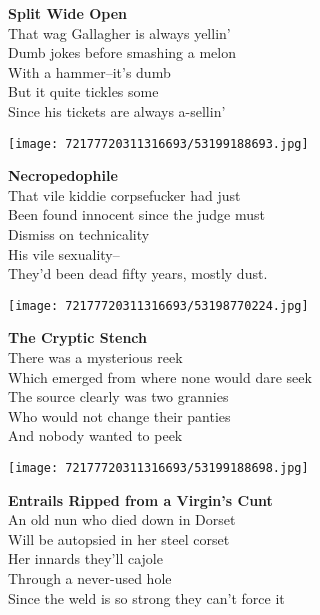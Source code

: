 \documentclass[10pt,letterpaper]{article}
\begin{document}
\begin{center}
\textbf{Split Wide Open}\\
\vskip 0.2in
That wag Gallagher is always yellin'\\
Dumb jokes before smashing a melon\\
With a hammer--it's dumb\\
But it quite tickles some\\
Since his tickets are always a-sellin'\\
\end{center}
\pagebreak

\begin{center}\texttt{[image: 72177720311316693/53199188693.jpg]}
\end{center}
\begin{center}
\textbf{Necropedophile}\\
\vskip 0.2in
That vile kiddie corpsefucker had just\\
Been found innocent since the judge must\\
Dismiss on technicality\\
His vile sexuality--\\
They'd been dead fifty years, mostly dust.\\
\end{center}
\pagebreak

\begin{center}\texttt{[image: 72177720311316693/53198770224.jpg]}
\end{center}
\begin{center}
\textbf{The Cryptic Stench}\\
\vskip 0.2in
There was a mysterious reek\\
Which emerged from where none would dare seek\\
The source clearly was two grannies\\
Who would not change their panties\\
And nobody wanted to peek\\
\end{center}
\pagebreak

\begin{center}
\texttt{[image: 72177720311316693/53199188698.jpg]}
\end{center}

\begin{center}
\textbf{Entrails Ripped from a Virgin's Cunt}\\
\vskip 0.2in
An old nun who died down in Dorset\\
Will be autopsied in her steel corset\\
Her innards they'll cajole\\
Through a never-used hole\\
Since the weld is so strong they can't force it\\
\end{center}
\pagebreak
\end{document}
